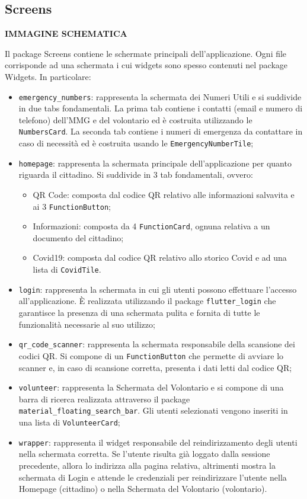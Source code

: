\documentclass[12pt,a4paper,twoside,openright,titlepage]{book}
\begin{document}
\subsection{Screens}
\textbf{IMMAGINE SCHEMATICA}\newline

Il package Screens contiene le schermate principali dell'applicazione. Ogni file corrisponde ad una schermata i cui widgets sono spesso contenuti nel package Widgets. In particolare:
\begin{itemize}
\item \texttt{emergency\_numbers}: rappresenta la schermata dei Numeri Utili e si suddivide in due tabs fondamentali. La prima tab contiene i contatti (email e numero di telefono) dell'MMG e del volontario ed è costruita utilizzando le \texttt{NumbersCard}. La seconda tab contiene i numeri di emergenza da contattare in caso di necessità ed è costruita usando le \texttt{EmergencyNumberTile};
\item \texttt{homepage}: rappresenta la schermata principale dell'applicazione per quanto riguarda il cittadino. Si suddivide in 3 tab fondamentali, ovvero:
\begin{itemize}
\item QR Code: composta dal codice QR relativo alle informazioni salvavita e ai 3 \texttt{FunctionButton};
\item Informazioni: composta da 4 \texttt{FunctionCard}, ognuna relativa a un documento del cittadino;
\item Covid19: composta dal codice QR relativo allo storico Covid e ad una lista di \texttt{CovidTile}.
\end{itemize}
\item \texttt{login}: rappresenta la schermata in cui gli utenti possono effettuare l'accesso all'applicazione. È realizzata utilizzando il package \texttt{flutter\_login} che garantisce la presenza di una schermata pulita e fornita di tutte le funzionalità necessarie al suo utilizzo;
\item \texttt{qr\_code\_scanner}: rappresenta la schermata responsabile della scansione dei codici QR. Si compone di un \texttt{FunctionButton} che permette di avviare lo scanner e, in caso di scansione corretta, presenta i dati letti dal codice QR;
\item \texttt{volunteer}: rappresenta la Schermata del Volontario e si compone di una barra di ricerca realizzata attraverso il package \texttt{material\_floating\_search\_bar}. Gli utenti selezionati vengono inseriti in una lista di \texttt{VolunteerCard};
\item \texttt{wrapper}: rappresenta il widget responsabile del reindirizzamento degli utenti nella schermata corretta. Se l'utente risulta già loggato dalla sessione precedente, allora lo indirizza alla pagina relativa, altrimenti mostra la schermata di Login e attende le credenziali per reindirizzare l'utente nella Homepage (cittadino) o nella Schermata del Volontario (volontario).
\end{itemize}
\end{document}
